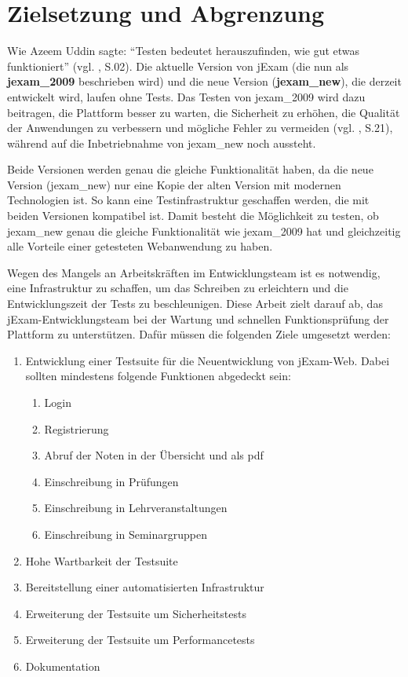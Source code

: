 
\section{Zielsetzung und Abgrenzung}


Wie Azeem Uddin  sagte: ``Testen bedeutet herauszufinden, wie gut etwas funktioniert'' (vgl. \cite{anand12importance}, S.02).
Die aktuelle Version von jExam (die nun als \textbf{\gls{jexam_2009}} beschrieben wird) und die neue Version (\textbf{\gls{jexam_new}}),
die derzeit entwickelt wird, laufen ohne Tests. Das Testen von \gls{jexam_2009} wird dazu beitragen, die Plattform
besser zu warten, die Sicherheit zu erhöhen, die Qualität der Anwendungen zu verbessern und mögliche Fehler zu
vermeiden (vgl. \cite{shultz2011software}, S.21), während auf die Inbetriebnahme von \gls{jexam_new} noch aussteht.


Beide Versionen werden genau die gleiche Funktionalität haben, da die neue Version (\gls{jexam_new}) nur eine Kopie der
alten Version mit modernen Technologien ist. So kann eine Testinfrastruktur geschaffen werden, die mit beiden Versionen
kompatibel ist. Damit besteht die Möglichkeit zu testen, ob \gls{jexam_new} genau die gleiche Funktionalität wie
\gls{jexam_2009} hat und gleichzeitig alle Vorteile einer
getesteten Webanwendung zu haben.

Wegen des Mangels an Arbeitskräften im Entwicklungsteam ist es notwendig,
eine Infrastruktur zu schaffen, um das Schreiben zu erleichtern und die
Entwicklungszeit der Tests zu beschleunigen. Diese Arbeit zielt darauf ab,
das jExam-Entwicklungsteam bei der Wartung und schnellen Funktionsprüfung der
Plattform zu unterstützen. Dafür müssen die folgenden Ziele umgesetzt werden:


\begin{enumerate}
    \item Entwicklung einer Testsuite für die Neuentwicklung von jExam-Web.
    Dabei sollten mindestens folgende Funktionen abgedeckt sein:
    \begin{enumerate}
        \item Login
        \item Registrierung
        \item Abruf der Noten in der Übersicht und als pdf
        \item Einschreibung in Prüfungen
        \item Einschreibung in Lehrveranstaltungen
        \item Einschreibung in Seminargruppen
    \end{enumerate}
    \item Hohe Wartbarkeit der Testsuite
    \item Bereitstellung einer automatisierten Infrastruktur
    \item Erweiterung der Testsuite um Sicherheitstests
    \item Erweiterung der Testsuite um Performancetests
    \item Dokumentation
\end{enumerate}